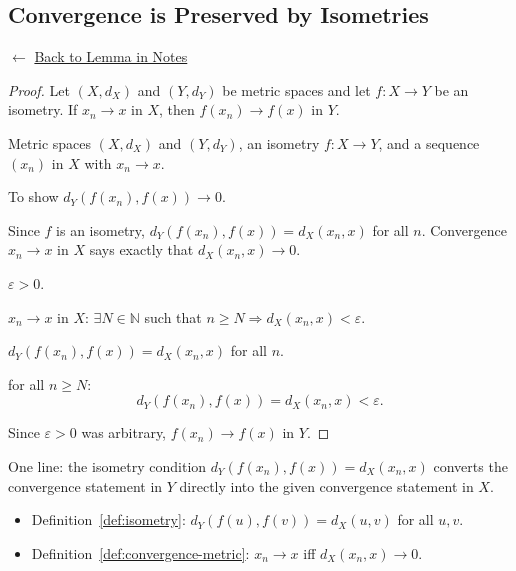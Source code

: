 
\subsection*{Convergence is Preserved by Isometries}
\label{prf:convergence-preserved-by-isometry}

\begin{remark*}[Return]
$\leftarrow$ \hyperref[lem:convergence-preserved]{Back to Lemma in Notes}
\end{remark*}

\begin{proof}
\Claim Let $(X,d_X)$ and $(Y,d_Y)$ be metric spaces and let $f : X \to Y$
be an isometry. If $x_n \to x$ in $X$, then $f(x_n) \to f(x)$ in $Y$.

\Given Metric spaces $(X,d_X)$ and $(Y,d_Y)$, an isometry $f : X \to Y$,
and a sequence $(x_n)$ in $X$ with $x_n \to x$.

\Goal To show $d_Y(f(x_n), f(x)) \to 0$.

\Strategy Since $f$ is an isometry, $d_Y(f(x_n), f(x)) = d_X(x_n, x)$ for all $n$.
Convergence $x_n \to x$ in $X$ says exactly that $d_X(x_n, x) \to 0$.

\medskip
\Let $\varepsilon > 0$.

\ByAss $x_n \to x$ in $X$: $\exists N \in \mathbb{N}$ such that $n \ge N \Rightarrow d_X(x_n, x) < \varepsilon$.

 $d_Y(f(x_n), f(x)) = d_X(x_n, x)$ for all $n$.

\Therefore for all $n \ge N$:
\[
d_Y(f(x_n), f(x)) = d_X(x_n, x) < \varepsilon.
\]

Since $\varepsilon > 0$ was arbitrary, $f(x_n) \to f(x)$ in $Y$. \AsReq
\end{proof}

\begin{remark*}
One line: the isometry condition $d_Y(f(x_n), f(x)) = d_X(x_n, x)$ converts
the convergence statement in $Y$ directly into the given convergence statement in $X$.
\end{remark*}

\begin{remark*}[Dependencies]
\begin{itemize}
  \item Definition~\ref{def:isometry}: $d_Y(f(u), f(v)) = d_X(u,v)$ for all $u,v$.
  \item Definition~\ref{def:convergence-metric}: $x_n \to x$ iff $d_X(x_n,x) \to 0$.
\end{itemize}
\end{remark*}
